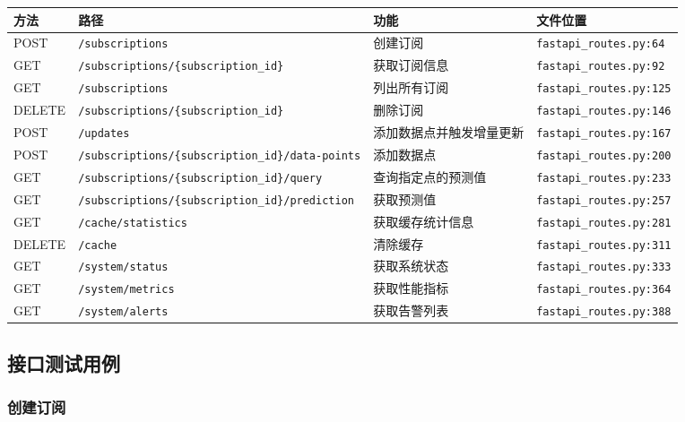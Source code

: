 \documentclass[12pt,a4paper,openany]{report}
\begin{document}
\begin{longtable}{|l|l|l|l|}
\hline
\textbf{方法} & \textbf{路径} & \textbf{功能} & \textbf{文件位置} \\
\hline
\endhead
POST & \texttt{/subscriptions} & 创建订阅 & \texttt{fastapi\_routes.py:64} \\
GET & \texttt{/subscriptions/\{subscription\_id\}} & 获取订阅信息 & \texttt{fastapi\_routes.py:92} \\
GET & \texttt{/subscriptions} & 列出所有订阅 & \texttt{fastapi\_routes.py:125} \\
DELETE & \texttt{/subscriptions/\{subscription\_id\}} & 删除订阅 & \texttt{fastapi\_routes.py:146} \\
POST & \texttt{/updates} & 添加数据点并触发增量更新 & \texttt{fastapi\_routes.py:167} \\
POST & \texttt{/subscriptions/\{subscription\_id\}/data-points} & 添加数据点 & \texttt{fastapi\_routes.py:200} \\
GET & \texttt{/subscriptions/\{subscription\_id\}/query} & 查询指定点的预测值 & \texttt{fastapi\_routes.py:233} \\
GET & \texttt{/subscriptions/\{subscription\_id\}/prediction} & 获取预测值 & \texttt{fastapi\_routes.py:257} \\
GET & \texttt{/cache/statistics} & 获取缓存统计信息 & \texttt{fastapi\_routes.py:281} \\
DELETE & \texttt{/cache} & 清除缓存 & \texttt{fastapi\_routes.py:311} \\
GET & \texttt{/system/status} & 获取系统状态 & \texttt{fastapi\_routes.py:333} \\
GET & \texttt{/system/metrics} & 获取性能指标 & \texttt{fastapi\_routes.py:364} \\
GET & \texttt{/system/alerts} & 获取告警列表 & \texttt{fastapi\_routes.py:388} \\
\hline
\end{longtable}

\subsection{接口测试用例}

\subsubsection{创建订阅}
\end{document}
